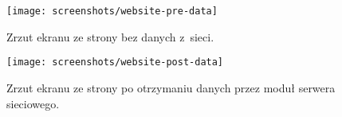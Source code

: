 \begin{figure}[!htbp]
    \centering
    \texttt{[image: screenshots/website-pre-data]}
    \caption{\label{img:website-pre-data}Zrzut ekranu ze strony bez danych z~sieci.}
\end{figure}

\begin{figure}[!htbp]
    \centering
    \texttt{[image: screenshots/website-post-data]}
    \caption{\label{img:website-post-data}Zrzut ekranu ze strony po otrzymaniu danych przez moduł serwera sieciowego.}
\end{figure}
